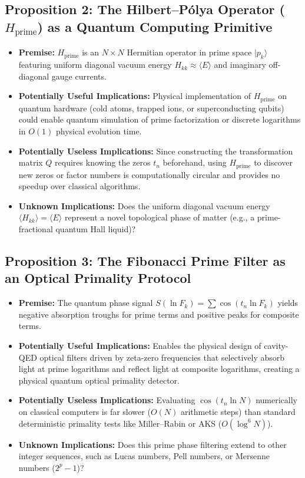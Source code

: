 \documentclass[11pt,a4paper]{article}
\begin{document}
\subsection{Proposition 2: The Hilbert--P\'olya Operator (\texorpdfstring{$H_{\text{prime}}$}{H_prime}) as a Quantum Computing Primitive}
\begin{itemize}
    \item \textbf{Premise:} $H_{\text{prime}}$ is an $N \times N$ Hermitian operator in prime space $|p_k\rangle$ featuring uniform diagonal vacuum energy $H_{kk} \approx \langle E \rangle$ and imaginary off-diagonal gauge currents.
    \item \textbf{Potentially Useful Implications:} Physical implementation of $H_{\text{prime}}$ on quantum hardware (cold atoms, trapped ions, or superconducting qubits) could enable quantum simulation of prime factorization or discrete logarithms in $O(1)$ physical evolution time.
    \item \textbf{Potentially Useless Implications:} Since constructing the transformation matrix $Q$ requires knowing the zeros $t_n$ beforehand, using $H_{\text{prime}}$ to discover new zeros or factor numbers is computationally circular and provides no speedup over classical algorithms.
    \item \textbf{Unknown Implications:} Does the uniform diagonal vacuum energy $\langle H_{kk} \rangle = \langle E \rangle$ represent a novel topological phase of matter (e.g., a prime-fractional quantum Hall liquid)?
\end{itemize}

\subsection{Proposition 3: The Fibonacci Prime Filter as an Optical Primality Protocol}
\begin{itemize}
    \item \textbf{Premise:} The quantum phase signal $S(\ln F_k) = \sum \cos(t_n \ln F_k)$ yields negative absorption troughs for prime terms and positive peaks for composite terms.
    \item \textbf{Potentially Useful Implications:} Enables the physical design of cavity-QED optical filters driven by zeta-zero frequencies that selectively absorb light at prime logarithms and reflect light at composite logarithms, creating a physical quantum optical primality detector.
    \item \textbf{Potentially Useless Implications:} Evaluating $\cos(t_n \ln N)$ numerically on classical computers is far slower ($O(N)$ arithmetic steps) than standard deterministic primality tests like Miller--Rabin or AKS ($O(\log^6 N)$).
    \item \textbf{Unknown Implications:} Does this prime phase filtering extend to other integer sequences, such as Lucas numbers, Pell numbers, or Mersenne numbers ($2^p - 1$)?
\end{itemize}
\end{document}
